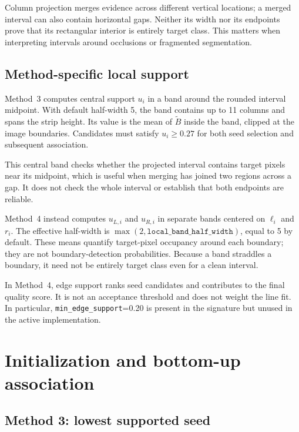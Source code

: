 Column projection merges evidence across different vertical locations;
a merged interval can also contain horizontal gaps. Neither its width
nor its endpoints prove that its rectangular interior is entirely target
class. This matters when interpreting intervals around occlusions or
fragmented segmentation.

\subsection{Method-specific local support}
\label{subsec:c4_support}

Method~3 computes central support $u_i$ in a band around the rounded
interval midpoint. With default half-width 5, the band contains up to
11 columns and spans the strip height. Its value is the mean of
$\widetilde B$ inside the band, clipped at the image boundaries.
Candidates must satisfy $u_i\geq0.27$ for both seed selection and
subsequent association.

This central band checks whether the projected interval contains target
pixels near its midpoint, which is useful when merging has joined two
regions across a gap. It does not check the whole interval or establish
that both endpoints are reliable.

Method~4 instead computes $u_{L,i}$ and $u_{R,i}$ in separate bands
centered on $\ell_i$ and $r_i$. The effective half-width is
$\max(2,\texttt{local\_band\_half\_width})$, equal to 5 by default.
These means quantify target-pixel occupancy around each boundary; they
are not boundary-detection probabilities. Because a band straddles a
boundary, it need not be entirely target class even for a clean interval.

In Method~4, edge support ranks seed candidates and contributes to the
final quality score. It is not an acceptance threshold and does not
weight the line fit. In particular, \texttt{min\_edge\_support}=0.20
is present in the signature but unused in the active implementation.

\section{Initialization and bottom-up association}
\label{sec:c4_selection}

\subsection{Method 3: lowest supported seed}
\label{subsec:c4_seed3}

